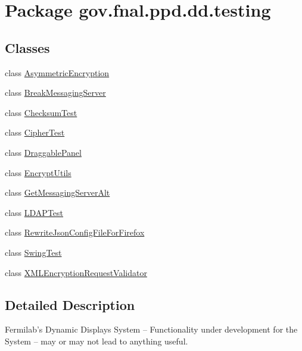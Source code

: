 \hypertarget{namespacegov_1_1fnal_1_1ppd_1_1dd_1_1testing}{\section{Package gov.\-fnal.\-ppd.\-dd.\-testing}
\label{namespacegov_1_1fnal_1_1ppd_1_1dd_1_1testing}
}
\subsection*{Classes}
\begin{DoxyCompactItemize}
\item 
class \hyperlink{classgov_1_1fnal_1_1ppd_1_1dd_1_1testing_1_1AsymmetricEncryption}{Asymmetric\-Encryption}
\item 
class \hyperlink{classgov_1_1fnal_1_1ppd_1_1dd_1_1testing_1_1BreakMessagingServer}{Break\-Messaging\-Server}
\item 
class \hyperlink{classgov_1_1fnal_1_1ppd_1_1dd_1_1testing_1_1ChecksumTest}{Checksum\-Test}
\item 
class \hyperlink{classgov_1_1fnal_1_1ppd_1_1dd_1_1testing_1_1CipherTest}{Cipher\-Test}
\item 
class \hyperlink{classgov_1_1fnal_1_1ppd_1_1dd_1_1testing_1_1DraggablePanel}{Draggable\-Panel}
\item 
class \hyperlink{classgov_1_1fnal_1_1ppd_1_1dd_1_1testing_1_1EncryptUtils}{Encrypt\-Utils}
\item 
class \hyperlink{classgov_1_1fnal_1_1ppd_1_1dd_1_1testing_1_1GetMessagingServerAlt}{Get\-Messaging\-Server\-Alt}
\item 
class \hyperlink{classgov_1_1fnal_1_1ppd_1_1dd_1_1testing_1_1LDAPTest}{L\-D\-A\-P\-Test}
\item 
class \hyperlink{classgov_1_1fnal_1_1ppd_1_1dd_1_1testing_1_1RewriteJsonConfigFileForFirefox}{Rewrite\-Json\-Config\-File\-For\-Firefox}
\item 
class \hyperlink{classgov_1_1fnal_1_1ppd_1_1dd_1_1testing_1_1SwingTest}{Swing\-Test}
\item 
class \hyperlink{classgov_1_1fnal_1_1ppd_1_1dd_1_1testing_1_1XMLEncryptionRequestValidator}{X\-M\-L\-Encryption\-Request\-Validator}
\end{DoxyCompactItemize}


\subsection{Detailed Description}
Fermilab's Dynamic Displays System -- Functionality under development for the System -- may or may not lead to anything useful.